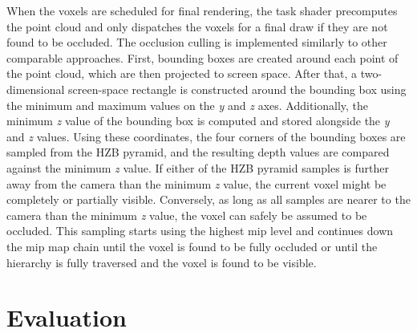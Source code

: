 \documentclass[conference]{IEEEtran}
\begin{document}
\noindent
When the voxels are scheduled for final rendering, the task shader precomputes the point cloud 
and only dispatches the voxels for a final draw if they are not found to be occluded. The occlusion 
culling is implemented similarly to other comparable approaches. First, bounding boxes are created 
around each point of the point cloud, which are then projected to screen space. After that, 
a two-dimensional screen-space rectangle is constructed around the bounding box using the minimum 
and maximum values on the \emph{y} and \emph{z} axes. Additionally, the minimum \emph{z} value of 
the bounding box is computed and stored alongside the \emph{y} and \emph{z} values. Using these 
coordinates, the four corners of the bounding boxes are sampled from the \ac{HZB} pyramid, and the 
resulting depth values are compared against the minimum \emph{z} value. If either of the 
\ac{HZB} pyramid samples is further away from the camera than the minimum \emph{z} value, the current 
voxel might be completely or partially visible. Conversely, as long as all samples are nearer to 
the camera than the minimum \emph{z} value, the voxel can safely be assumed to be occluded. This 
sampling starts using the highest mip level and continues down the mip map chain until the voxel is 
found to be fully occluded or until the hierarchy is fully traversed and the voxel is found to be 
visible. 

\section{Evaluation} \label{sec-evaluation}
\end{document}
